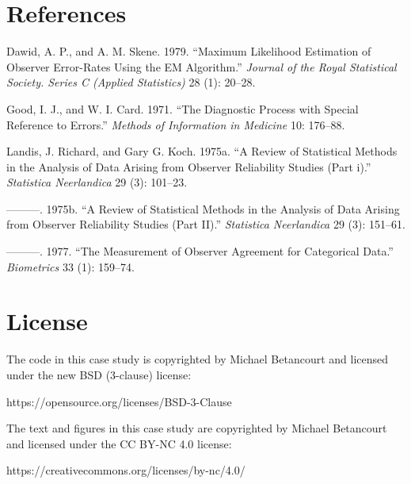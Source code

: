 \documentclass[
  letterpaper,
  DIV=11,
  numbers=noendperiod]{scrartcl}
\newlength{\cslhangindent}
\newlength{\cslentryspacingunit} %
\newenvironment{CSLReferences}[2] %
 {%
  \setlength{\parindent}{0pt}
  \ifodd #1
  \let\oldpar\par
  \def\par{\hangindent=\cslhangindent\oldpar}
  \fi
  \setlength{\parskip}{#2\cslentryspacingunit}
 }%
 {}
\begin{document}
\hypertarget{references}{%
\section*{References}\label{references}}

\hypertarget{refs}{}
\begin{CSLReferences}{1}{0}
\leavevmode{}%
Dawid, A. P., and A. M. Skene. 1979. {``Maximum Likelihood Estimation of
Observer Error-Rates Using the EM Algorithm.''} \emph{Journal of the
Royal Statistical Society. Series C (Applied Statistics)} 28 (1):
20--28.

\leavevmode{}%
Good, I. J., and W. I. Card. 1971. {``The Diagnostic Process with
Special Reference to Errors.''} \emph{Methods of Information in
Medicine} 10: 176--88.

\leavevmode{}%
Landis, J. Richard, and Gary G. Koch. 1975a. {``A Review of Statistical
Methods in the Analysis of Data Arising from Observer Reliability
Studies (Part i).''} \emph{Statistica Neerlandica} 29 (3): 101--23.

\leavevmode{}%
---------. 1975b. {``A Review of Statistical Methods in the Analysis of
Data Arising from Observer Reliability Studies (Part II).''}
\emph{Statistica Neerlandica} 29 (3): 151--61.

\leavevmode{}%
---------. 1977. {``The Measurement of Observer Agreement for
Categorical Data.''} \emph{Biometrics} 33 (1): 159--74.

\end{CSLReferences}

\hypertarget{license}{%
\section*{License}\label{license}}

The code in this case study is copyrighted by Michael Betancourt and
licensed under the new BSD (3-clause) license:

https://opensource.org/licenses/BSD-3-Clause

The text and figures in this case study are copyrighted by Michael
Betancourt and licensed under the CC BY-NC 4.0 license:

https://creativecommons.org/licenses/by-nc/4.0/
\end{document}
